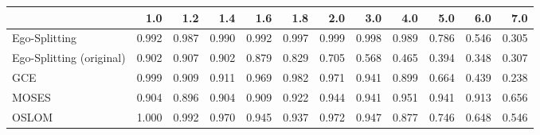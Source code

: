 \begin{tabular}{lrrrrrrrrrrr}
\toprule
{} &   1.0 &   1.2 &   1.4 &   1.6 &   1.8 &   2.0 &   3.0 &   4.0 &   5.0 &   6.0 &   7.0 \\
\midrule
Ego-Splitting            & 0.992 & 0.987 & 0.990 & 0.992 & 0.997 & 0.999 & 0.998 & 0.989 & 0.786 & 0.546 & 0.305 \\
Ego-Splitting (original) & 0.902 & 0.907 & 0.902 & 0.879 & 0.829 & 0.705 & 0.568 & 0.465 & 0.394 & 0.348 & 0.307 \\
GCE                      & 0.999 & 0.909 & 0.911 & 0.969 & 0.982 & 0.971 & 0.941 & 0.899 & 0.664 & 0.439 & 0.238 \\
MOSES                    & 0.904 & 0.896 & 0.904 & 0.909 & 0.922 & 0.944 & 0.941 & 0.951 & 0.941 & 0.913 & 0.656 \\
OSLOM                    & 1.000 & 0.992 & 0.970 & 0.945 & 0.937 & 0.972 & 0.947 & 0.877 & 0.746 & 0.648 & 0.546 \\
\bottomrule
\end{tabular}
